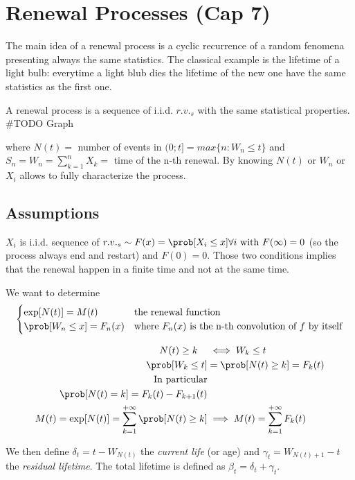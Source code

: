 \chapter{Renewal Processes (Cap 7)}
The main idea of a renewal process is a cyclic recurrence of a random fenomena presenting always the same statistics. The classical example is the lifetime of a light bulb: everytime a light blub dies the lifetime of the new one have the same statistics as the first one.

A renewal process is a sequence of i.i.d. $r.v._s$ with the same statistical properties.
\#TODO Graph

where $N(t) = $ number of events in $(0;t] = max\{n : W_n \le t \}$ and $ S_n = W_n = \sum\limits_{k=1}^n X_k =$ time of the n-th renewal.
By knowing $N(t)$ or $W_n$ or $X_i$ allows to fully characterize the process.

\section{Assumptions}
$X_i$ is i.i.d. sequence of $r.v._s \sim F(x) = \prob[X_i \le x] \forall i \text{ with } F(\infty)=0$
(so the process always end and restart) and $F(0)=0$. Those two conditions implies that the renewal happen in a finite time and not at the same time.

We want to determine
$$\begin{cases}
	\exp[N(t)]=M(t) & \text{the renewal function} \\
	\prob[W_n \le x] = F_n(x) & \text{where } F_n(x) \text{ is the n-th convolution of $f$ by itself}
\end{cases}$$

\begin{equation}\begin{split} \noindent
	N(t)\ge k \quad &\iff W_k \le t\\
	\prob[W_k \le t] &= \prob[N(t) \ge k] = F_k(t) \\
	\text{In particular} \\
	\prob[N(t)=k] = F_k(t)-F_{k+1}(t)& \\
	M(t) = \exp[N(t)]=\sum\limits_{k=1}^{+\infty}\prob[N(t)\ge k] &\implies M(t)=\sum\limits_{k=1}^{+\infty}F_k(t)
\end{split}\end{equation}

We then define $\delta_t = t - W_{N(t)}$ the \textit{current life} (or age) and $\gamma_t = W_{N(t)+1}-t$ the \textit{residual lifetime}.
The total lifetime is defined as $\beta_t = \delta_t + \gamma_t$.

